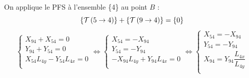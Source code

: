 \documentclass[10pt]{article}
\begin{document}
{\begin{corrige}
On applique le PFS à l'ensemble \{4\} au point $B$ :
$$
\left\{\mathcal{T} \left(5\rightarrow 4 \right) \right\} + \left\{\mathcal{T} \left(9\rightarrow 4 \right) \right\} = \{0\} 
$$
$$
\left\{
\begin{array}{l}
X_{94} + X_{54} = 0 \\
Y_{94} + Y_{54} = 0 \\
 X_{54}L_{4y} - Y_{54}L_{4x} = 0 \\
\end{array}
\right.
\Longleftrightarrow 
\left\{
\begin{array}{l}
 X_{54} = -X_{94}  \\
 Y_{54} = - Y_{94}  \\
 -X_{94}L_{4y} + Y_{94}L_{4x} = 0 \\
\end{array}
\right.
\Longleftrightarrow 
\left\{
\begin{array}{l}
 X_{54} = - X_{94}  \\
 Y_{54} = - Y_{94}  \\
 X_{94} =  Y_{94}\dfrac{L_{4x}}{L_{4y}}  \\
\end{array}
\right.
$$


\end{corrige}}{}
\end{document}
